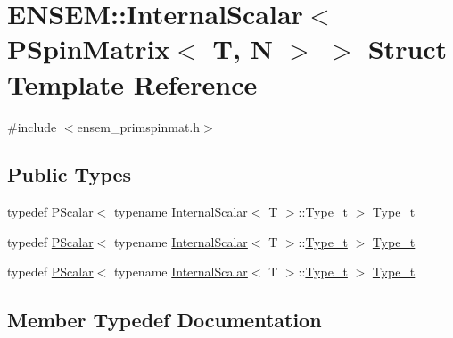 \hypertarget{structENSEM_1_1InternalScalar_3_01PSpinMatrix_3_01T_00_01N_01_4_01_4}{}\section{E\+N\+S\+EM\+:\+:Internal\+Scalar$<$ P\+Spin\+Matrix$<$ T, N $>$ $>$ Struct Template Reference}
\label{structENSEM_1_1InternalScalar_3_01PSpinMatrix_3_01T_00_01N_01_4_01_4}


{\ttfamily \#include $<$ensem\+\_\+primspinmat.\+h$>$}

\subsection*{Public Types}
\begin{DoxyCompactItemize}
\item 
typedef \mbox{\hyperlink{classENSEM_1_1PScalar}{P\+Scalar}}$<$ typename \mbox{\hyperlink{structENSEM_1_1InternalScalar}{Internal\+Scalar}}$<$ T $>$\+::\mbox{\hyperlink{structENSEM_1_1InternalScalar_3_01PSpinMatrix_3_01T_00_01N_01_4_01_4_acfe33659fffa5fb364eb7d27a1fda7db}{Type\+\_\+t}} $>$ \mbox{\hyperlink{structENSEM_1_1InternalScalar_3_01PSpinMatrix_3_01T_00_01N_01_4_01_4_acfe33659fffa5fb364eb7d27a1fda7db}{Type\+\_\+t}}
\item 
typedef \mbox{\hyperlink{classENSEM_1_1PScalar}{P\+Scalar}}$<$ typename \mbox{\hyperlink{structENSEM_1_1InternalScalar}{Internal\+Scalar}}$<$ T $>$\+::\mbox{\hyperlink{structENSEM_1_1InternalScalar_3_01PSpinMatrix_3_01T_00_01N_01_4_01_4_acfe33659fffa5fb364eb7d27a1fda7db}{Type\+\_\+t}} $>$ \mbox{\hyperlink{structENSEM_1_1InternalScalar_3_01PSpinMatrix_3_01T_00_01N_01_4_01_4_acfe33659fffa5fb364eb7d27a1fda7db}{Type\+\_\+t}}
\item 
typedef \mbox{\hyperlink{classENSEM_1_1PScalar}{P\+Scalar}}$<$ typename \mbox{\hyperlink{structENSEM_1_1InternalScalar}{Internal\+Scalar}}$<$ T $>$\+::\mbox{\hyperlink{structENSEM_1_1InternalScalar_3_01PSpinMatrix_3_01T_00_01N_01_4_01_4_acfe33659fffa5fb364eb7d27a1fda7db}{Type\+\_\+t}} $>$ \mbox{\hyperlink{structENSEM_1_1InternalScalar_3_01PSpinMatrix_3_01T_00_01N_01_4_01_4_acfe33659fffa5fb364eb7d27a1fda7db}{Type\+\_\+t}}
\end{DoxyCompactItemize}


\subsection{Member Typedef Documentation}
\mbox{\label{structENSEM_1_1InternalScalar_3_01PSpinMatrix_3_01T_00_01N_01_4_01_4_acfe33659fffa5fb364eb7d27a1fda7db}} 
